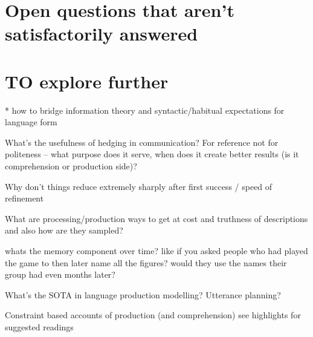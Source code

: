\documentclass[]{article}
\begin{document}
\section{Open questions that aren't satisfactorily answered}
\section{TO explore further }

* how to bridge information theory and syntactic/habitual expectations for language form 

What's the usefulness of hedging in communication? For reference not for politeness -- what purpose does it serve, when does it create better results (is it comprehension or production side)? 

Why don't things reduce extremely sharply after first success / speed of refinement

What are processing/production ways to get at cost and truthness of descriptions and also how are they sampled? 

whats the memory component over time? like if you asked people who had played the game to then later name all the figures? would they use the names their group had even months later? 












What's the SOTA in language production modelling? Utterance planning? 

Constraint based accounts of production (and comprehension) see \cite{hanna2003} highlights for suggested readings
\end{document}
